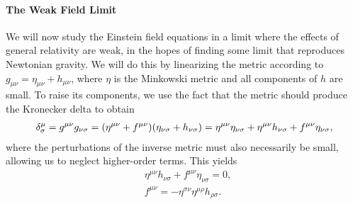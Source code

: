 \paragraph{The Weak Field Limit}
We will now study the Einstein field equations in a limit where the effects of general relativity are weak, in the hopes of finding some limit that reproduces Newtonian gravity. We will do this by linearizing the metric according to $g_{\mu\nu} = \eta_{\mu\nu} + h_{\mu\nu}$, where $\eta$ is the Minkowski metric and all components of $h$ are small. To raise its components, we use the fact that the metric should produce the Kronecker delta to obtain
\begin{align*}
	\kdelta{\mu}{\sigma} = g^{\mu\nu}g_{\nu\sigma} = (\eta^{\mu\nu} + f^{\mu\nu})(\eta_{\nu\sigma} + h_{\nu\sigma}) = \eta^{\mu\nu}\eta_{\nu\sigma} + \eta^{\mu\nu}h_{\nu\sigma} + f^{\mu\nu}\eta_{\nu\sigma},
\end{align*}
where the perturbations of the inverse metric must also necessarily be small, allowing us to neglect higher-order terms. This yields
\begin{align*}
	&\eta^{\mu\nu}h_{\nu\sigma} + f^{\mu\nu}\eta_{\nu\sigma} = 0, \\
	&f^{\mu\nu} = -\eta^{\sigma\nu}\eta^{\mu\rho}h_{\rho\sigma}.
\end{align*}

